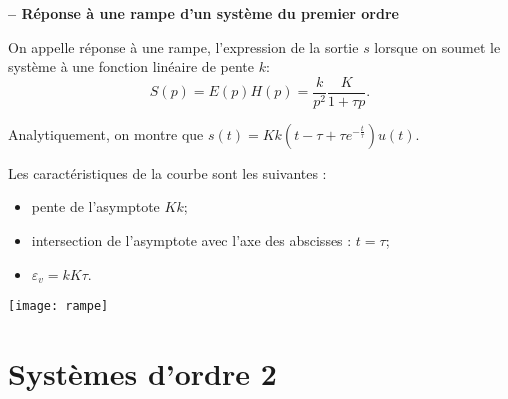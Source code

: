 \begin{resultat}\textbf{\textsf{\small -- Réponse à une rampe d'un système du premier ordre}}~\\

\noindent \begin{minipage}[c]{.65\linewidth}
On appelle réponse à une rampe, l'expression de la sortie $s$ lorsque on soumet le système à une fonction linéaire de pente $k$: 
$$
S(p)=E(p)H(p) = \dfrac{k}{p^2} \dfrac{K}{1+\tau p}.
$$ 


Analytiquement, on montre que $s(t)=Kk \left(t-\tau+\tau e^{-\frac{t}{\tau}}\right)u(t)$. 

Les caractéristiques de la courbe sont les suivantes : 
\begin{itemize}
\item pente de l'asymptote $K k$;
\item intersection de l'asymptote avec l'axe des abscisses : $t=\tau$;
\item $\varepsilon_{v}=kK\tau$.
\end{itemize}


\end{minipage} \hfill
\begin{minipage}[c]{.32\linewidth}
\centering
\texttt{[image: rampe]}
\end{minipage}
\end{resultat}



\section{Systèmes d'ordre 2}

